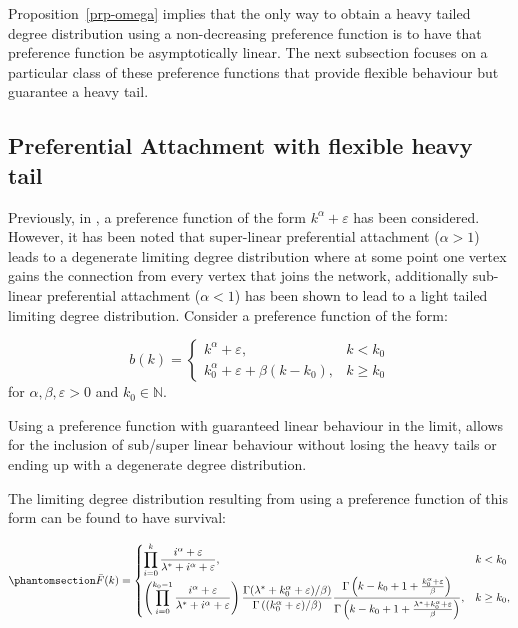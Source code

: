 \documentclass[
  sn-basic,
]{sn-jnl}
\theoremstyle{plain}
\theoremstyle{remark}
\begin{document}
Proposition~\ref{prp-omega} implies that the only way to obtain a heavy
tailed degree distribution using a non-decreasing preference function is
to have that preference function be asymptotically linear. The next
subsection focuses on a particular class of these preference functions
that provide flexible behaviour but guarantee a heavy tail.

\subsection{Preferential Attachment with flexible heavy
tail}\label{sec-model}

Previously, in \citet{krapivsky01}, a preference function of the form
\(k^\alpha +\varepsilon\) has been considered. However, it has been
noted that super-linear preferential attachment (\(\alpha > 1\)) leads
to a degenerate limiting degree distribution where at some point one
vertex gains the connection from every vertex that joins the network,
additionally sub-linear preferential attachment (\(\alpha <1\)) has been
shown to lead to a light tailed limiting degree distribution. Consider a
preference function of the form:

\[
b(k) = \begin{cases}
k^\alpha + \varepsilon,&k<k_0\\
k_0^\alpha + \varepsilon + \beta(k-k_0), &k\ge k_0
\end{cases}
\] for \(\alpha,\beta, \varepsilon>0\) and \(k_0\in\mathbb N\).

Using a preference function with guaranteed linear behaviour in the
limit, allows for the inclusion of sub/super linear behaviour without
losing the heavy tails or ending up with a degenerate degree
distribution.

The limiting degree distribution resulting from using a preference
function of this form can be found to have survival:

\begin{equation}\phantomsection\label{eq-polysurv}{
\bar F(k) = \begin{cases}
\displaystyle\prod_{i=0}^{k}\frac{i^\alpha + \varepsilon}{\lambda^*+i^\alpha + \varepsilon},&k<k_0\\
\displaystyle\left(\prod_{i=0}^{k_0-1}\frac{i^\alpha + \varepsilon}{\lambda^*+i^\alpha + \varepsilon}\right)\frac{\Gamma(\lambda^*+k_0^\alpha + \varepsilon)/\beta)}{\Gamma\left((k_0^\alpha + \varepsilon)/\beta\right)} \frac{\Gamma\left(k-k_0 + 1 +\frac{k_0^\alpha + \varepsilon}{\beta}\right)}{\Gamma\left(k-k_0 + 1 +\frac{\lambda^* +k_0^\alpha + \varepsilon}{\beta}\right)},&k\ge k_0,
\end{cases}
}\end{equation}
\end{document}
